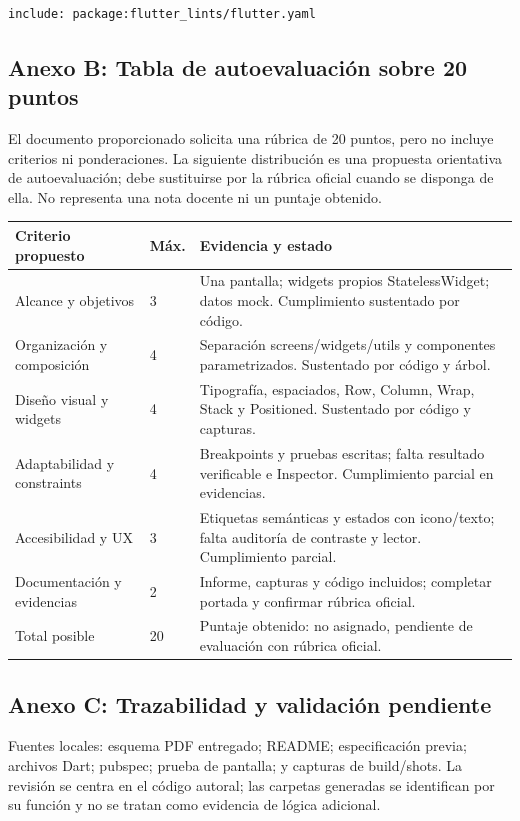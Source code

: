 \documentclass[12pt,a4paper]{article}
\newcommand{\codigo}[1]{\texttt{\detokenize{#1}}}
\begin{document}
\subsubsection*{\codigo{analysis_options.yaml}}
\begin{lstlisting}
include: package:flutter_lints/flutter.yaml

\end{lstlisting}

\subsection*{Anexo B: Tabla de autoevaluación sobre 20 puntos}
El documento proporcionado solicita una rúbrica de 20 puntos, pero no incluye criterios ni ponderaciones. La siguiente distribución es una propuesta orientativa de autoevaluación; debe sustituirse por la rúbrica oficial cuando se disponga de ella. No representa una nota docente ni un puntaje obtenido.
\begin{longtable}{p{3.5cm}p{1cm}p{8.5cm}}
\textbf{Criterio propuesto} & \textbf{Máx.} & \textbf{Evidencia y estado}\\\hline
Alcance y objetivos & 3 & Una pantalla; widgets propios StatelessWidget; datos mock. Cumplimiento sustentado por código.\\
Organización y composición & 4 & Separación screens/widgets/utils y componentes parametrizados. Sustentado por código y árbol.\\
Diseño visual y widgets & 4 & Tipografía, espaciados, Row, Column, Wrap, Stack y Positioned. Sustentado por código y capturas.\\
Adaptabilidad y constraints & 4 & Breakpoints y pruebas escritas; falta resultado verificable e Inspector. Cumplimiento parcial en evidencias.\\
Accesibilidad y UX & 3 & Etiquetas semánticas y estados con icono/texto; falta auditoría de contraste y lector. Cumplimiento parcial.\\
Documentación y evidencias & 2 & Informe, capturas y código incluidos; completar portada y confirmar rúbrica oficial.\\\hline
Total posible & 20 & Puntaje obtenido: no asignado, pendiente de evaluación con rúbrica oficial.\\
\end{longtable}
\subsection*{Anexo C: Trazabilidad y validación pendiente}
Fuentes locales: esquema PDF entregado; README; especificación previa; archivos Dart; pubspec; prueba de pantalla; y capturas de build/shots. La revisión se centra en el código autoral; las carpetas generadas se identifican por su función y no se tratan como evidencia de lógica adicional.
\end{document}
